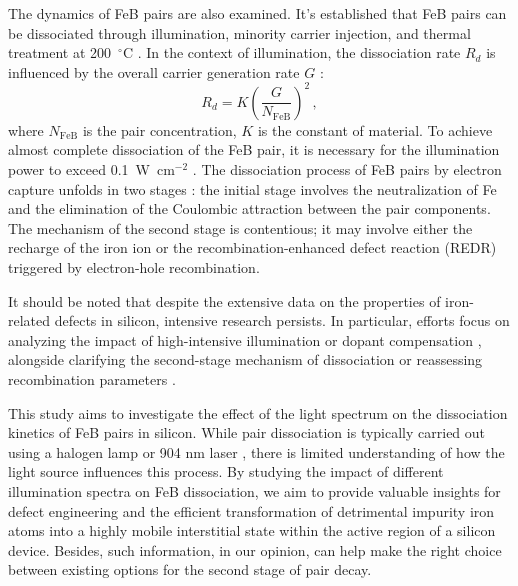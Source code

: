 \documentclass{WileyMSP-template}
\begin{document}
The dynamics of FeB pairs are also examined. 
It's established that FeB pairs can be dissociated through illumination, minority carrier injection, and thermal treatment at 200~$^\circ$C \cite{FeBAssJAP2014}.
In the context of illumination, the dissociation rate $R_d$ is influenced by the overall carrier generation rate $G$ \cite{FeBLight2,FeBAssJAP2014,FeBKin2019,FeMethod2012}: 
\begin{equation}
\label{eqRd}
R_d=K\left(\frac{G}{N_\mathrm{FeB}}\right)^2\,,
\end{equation}
where
$N_\mathrm{FeB}$ is the pair concentration,
$K$ is the constant of material.
To achieve almost complete dissociation of the FeB pair, it is necessary for the illumination power to exceed 0.1~W~cm$^{-2}$ \cite{Macdonald2004}.
The dissociation process of FeB pairs by electron capture unfolds in two stages \cite{KIMERLINGFeB,FeBAssJAP2014}: 
the initial stage involves the neutralization of Fe and the elimination of the Coulombic attraction between the pair components. 
The mechanism of the second stage is contentious; it may involve either the recharge of the iron ion or the recombination-enhanced defect reaction 
(REDR) triggered by electron-hole recombination.


It should be noted that despite the extensive data on the properties of iron-related defects in silicon, intensive research persists. 
In particular, efforts focus on analyzing the impact of high-intensive  illumination \cite{FeBStrongIll} 
or dopant compensation \cite{Zhu2015}, 
alongside clarifying the second-stage mechanism of dissociation \cite{Sun2021}
or reassessing recombination parameters \cite{Le2024}.

This study aims to investigate the effect of the light spectrum on the dissociation kinetics of FeB pairs in silicon.
While pair dissociation is typically carried out using a halogen lamp \cite{FeBLight2,Sun2021} 
or 904 nm laser \cite{FeBStrongIll,FeBAssJAP2014,lauer2016}, there is limited understanding of how the light source influences this process.
By studying the impact of different illumination spectra on FeB dissociation,
we aim to provide valuable insights for defect engineering and the efficient transformation of detrimental impurity iron atoms into a highly mobile interstitial state
within the active region of a silicon device.
Besides, such information, in our opinion, can help make the right choice between existing options for the second stage of pair decay.
\end{document}
